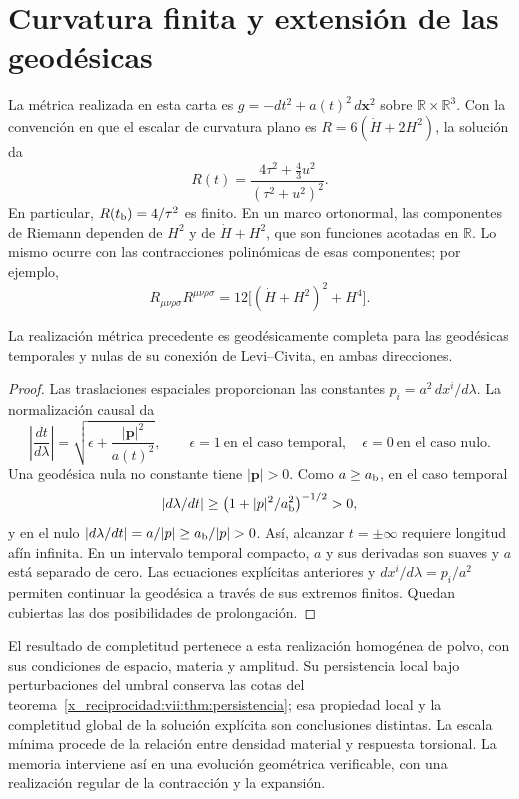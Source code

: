 \section{Curvatura finita y extensión de las geodésicas}
La métrica realizada en esta carta es
\(g=-dt^2+a(t)^2\,d\mathbf x^2\) sobre
\(\mathbb R\times\mathbb R^3\). Con la convención en que
el escalar de curvatura plano es \(R=6(\dot H+2H^2)\), la solución da
\[
 R(t)=\frac{4\tau^2+\frac43u^2}{(\tau^2+u^2)^2}.
\]
En particular, \(R(t_{\rm b})=4/\tau^2\) es finito.
En un marco ortonormal, las componentes de Riemann dependen de
\(H^2\) y de \(\dot H+H^2\), que son funciones acotadas en
\(\mathbb R\). Lo mismo ocurre con las contracciones polinómicas
de esas componentes; por ejemplo,
\[
 R_{\mu\nu\rho\sigma}R^{\mu\nu\rho\sigma}
 =12\bigl[(\dot H+H^2)^2+H^4\bigr].
\]

\begin{proposition}
\label{x_reciprocidad:vii:prop:completitud-causal-polvo}
La realización métrica precedente es geodésicamente completa
para las geodésicas temporales y nulas de su conexión de
Levi--Civita, en ambas direcciones.
\end{proposition}
\begin{proof}
Las traslaciones espaciales proporcionan las constantes
\(p_i=a^2\,dx^i/d\lambda\). La normalización causal da
\[
 \left|\frac{dt}{d\lambda}\right|
 =\sqrt{\epsilon+\frac{|\mathbf p|^2}{a(t)^2}},
 \qquad \epsilon=1\ \text{en el caso temporal},\quad
 \epsilon=0\ \text{en el caso nulo}.
\]
Una geodésica nula no constante tiene \(|\mathbf p|>0\).
Como \(a\geq a_{\rm b}\), en el caso temporal
\[
 \left|\frac{d\lambda}{dt}\right|
 \geq\left(1+\frac{|\mathbf p|^2}{a_{\rm b}^2}\right)^{-1/2}>0,
\]
y en el nulo
\(\left|d\lambda/dt\right|=a/|\mathbf p|
 \geq a_{\rm b}/|\mathbf p|>0\).
Así, alcanzar \(t=\pm\infty\) requiere longitud afín infinita.
En un intervalo temporal compacto, \(a\) y sus derivadas son
suaves y \(a\) está separado de cero. Las ecuaciones explícitas
anteriores y \(dx^i/d\lambda=p_i/a^2\) permiten continuar la
geodésica a través de sus extremos finitos. Quedan cubiertas
las dos posibilidades de prolongación.
\end{proof}

El resultado de completitud pertenece a esta realización homogénea de
polvo, con sus condiciones de espacio, materia y amplitud. Su
persistencia local bajo perturbaciones del umbral conserva las cotas
del teorema~\ref{x_reciprocidad:vii:thm:persistencia}; esa propiedad local y la
completitud global de la solución explícita son conclusiones distintas.
La escala mínima procede de la relación entre densidad material y
respuesta torsional. La memoria interviene así en una evolución
geométrica verificable, con una realización regular de la contracción
y la expansión.

